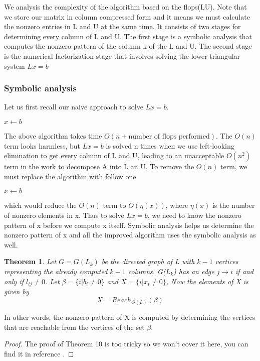 \documentclass[11pt]{article}
\newtheorem{theorem}{Theorem}
\begin{document}
We analysis the complexity of the algorithm based on the flops(LU). Note that we store our matrix in column compressed form and it means we must calculate the nonzero entries in L and U at the same time. It consists of two stages for determining every column of L and U. The first stage is a symbolic analysis that computes the nonzero pattern of the column k of the L and U. The second stage is the numerical factorization stage that involves solving the lower triangular system $Lx=b$


\subsubsection{Symbolic analysis}
Let us first recall our naive approach to solve $Lx=b$.\\ \begin{algorithm}[H]
$x\gets b$\;
{
}
\end{algorithm}
The above algorithm takes time $O(n+\text{number of flops performed})$. The $O(n)$ term looks harmless, but $Lx=b$ is solved n times when we use left-looking elimination to get every column of L and U, leading to an unacceptable $O(n^2)$ term in the work to decompose A into L an U. To remove the $O(n)$ term, we must replace the algorithm with follow one
\begin{algorithm}
$x\gets b$\;
{
}
\end{algorithm}
which would reduce the $O(n)$ term to $O(\eta(x))$, where $\eta(x)$ is the number of nonzero elements in x. Thus to solve $L x=b$, we need to know the nonzero pattern of x before we compute x itself. Symbolic analysis helps us determine the nonzero pattern of x and all the improved algorithm uses the symbolic analysis as well.
\begin{theorem}
    Let $G = G(L_k)$ be the directed graph of L with $k-1$ vertices representing the already computed $k-1$ columns. G($L_k$) has an edge $j \rightarrow i$ if and only if $l_{ij} \neq 0$. Let $\beta = \{ i | b_i \ne 0 \}$ and $X = \{ i | x_i \ne 0 \}$, Now the elements of X is given by
    \[
        X = Reach_{G(L)}(\beta)
    \]
\end{theorem}
In other words, the nonzero pattern of X is computed by determining the vertices that are reachable from the vertices of the set $\beta$.
\begin{proof}
The proof of Theorem 10 is too tricky so we won't cover it here, you can find it in reference \cite{rose1976algorithmic}.
\end{proof}
\end{document}
